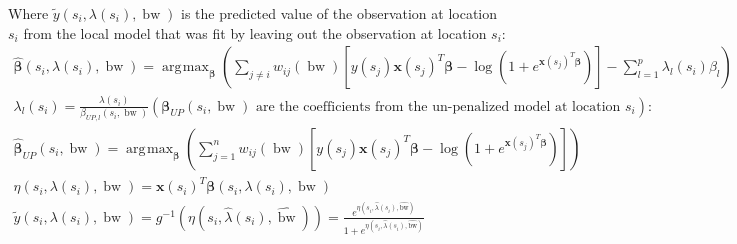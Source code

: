 \documentclass[10pt]{amsart}
\DeclareMathOperator*{\argmax}{\arg\!\max}
\DeclareMathOperator*{\bw}{\mbox{bw}}
\newcommand{\vect}[1]{\boldsymbol{#1}}
\begin{document}
		Where $\tilde{y} \left(s_i, \lambda(s_i), \bw \right)$ is the predicted value of the observation at location $s_i$ from the local model that was fit by leaving out the observation at location $s_i$:	
		\begin{gather*}
			\hat{\vect{\beta}} \left(s_i, \lambda(s_i), \bw \right) = \argmax_{\vect{\beta}} \left( \sum_{j \neq i} w_{ij}(\bw) \left[y(s_j) \vect{x}(s_j)^T \vect{\beta} - \log{(1+e^{\vect{x}(s_j)^T \vect{\beta}})} \right] -  \sum_{l=1}^p \lambda_l(s_i) \beta_l \right)\\	
			\lambda_l(s_i) = \frac{\lambda(s_i)}{\beta_{UP,l}(s_i, \bw)} \left( \vect{\beta}_{UP}(s_i, \bw) \text{ are the coefficients from the un-penalized model at location } s_i \right) \text{:}\\
			\hat{\vect{\beta}}_{UP}(s_i, \bw) = \argmax_{\vect{\beta}} \left( \sum_{j=1}^n w_{ij}(\bw) \left[ y(s_j) \vect{x}(s_j)^T \vect{\beta} - \log{(1+e^{\vect{x}(s_j)^T \vect{\beta}})} \right] \right)\\	
			\eta \left(s_i, \lambda(s_i), \bw \right) = \vect{x}(s_i)^T \vect{\beta} \left(s_i, \lambda(s_i), \bw \right)\\
			\tilde{y} \left(s_i, \lambda(s_i), \bw \right) = g^{-1} \left(\eta \left(s_i, \hat{\lambda}(s_i), \hat{\bw} \right) \right) = \frac{e^{\eta \left(s_i, \hat{\lambda}(s_i), \hat{\text{bw}} \right)}}{1+e^{\eta \left(s_i, \hat{\lambda}(s_i), \hat{\text{bw}} \right)}}			
		\end{gather*}
		
\end{document}
